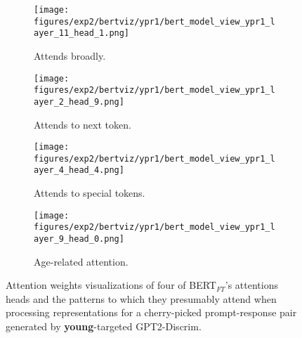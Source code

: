\begin{figure}[H]
     \centering
     \begin{subfigure}[b]{0.22\textwidth}
        \centering
        \texttt{[image: figures/exp2/bertviz/ypr1/bert\_model\_view\_ypr1\_layer\_11\_head\_1.png]}
        \captionsetup{font=footnotesize,labelfont=footnotesize}
        \caption{Attends broadly.}
        \label{subfig:bertviz_model_view_ypr1_broad}
     \end{subfigure}
     \quad
     \begin{subfigure}[b]{0.22\textwidth}
        \centering
        \texttt{[image: figures/exp2/bertviz/ypr1/bert\_model\_view\_ypr1\_layer\_2\_head\_9.png]}
        \captionsetup{font=footnotesize,labelfont=footnotesize}
        \caption{Attends to next token.}
        \label{subfig:bertviz_model_view_ypr1_next}
     \end{subfigure}
    \quad
    \begin{subfigure}[b]{0.22\textwidth}
        \centering
        \texttt{[image: figures/exp2/bertviz/ypr1/bert\_model\_view\_ypr1\_layer\_4\_head\_4.png]}
        \captionsetup{font=footnotesize,labelfont=footnotesize}
        \caption{Attends to special tokens.}
        \label{subfig:bertviz_model_view_ypr1_special}
     \end{subfigure}
    \quad
     \begin{subfigure}[b]{0.22\textwidth}
        \centering
        \texttt{[image: figures/exp2/bertviz/ypr1/bert\_model\_view\_ypr1\_layer\_9\_head\_0.png]}
        \captionsetup{font=footnotesize,labelfont=footnotesize}
        \caption{Age-related attention.}
        \label{subfig:bertviz_model_view_ypr1_age}
     \end{subfigure}
    \caption{Attention weights visualizations of four of BERT$_{FT}$'s attentions heads and the patterns to which they presumably attend when processing representations for a cherry-picked prompt-response pair generated by \textbf{young}-targeted GPT2-Discrim.}
    \label{fig:bertviz_model_view_ypr1}
\end{figure}

